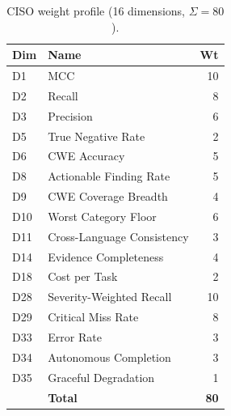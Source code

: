 \documentclass[10pt,twocolumn]{article}
\begin{document}
\begin{table}[t]
\centering
\caption{CISO weight profile (16 dimensions, $\Sigma = 80$).}
\label{tab:ciso_profile}
\small
\begin{tabular}{@{}l l r@{}}
\toprule
\textbf{Dim} & \textbf{Name} & \textbf{Wt} \\
\midrule
D1  & MCC                        & 10 \\
D2  & Recall                     & 8 \\
D3  & Precision                  & 6 \\
D5  & True Negative Rate         & 2 \\
D6  & CWE Accuracy               & 5 \\
D8  & Actionable Finding Rate    & 5 \\
D9  & CWE Coverage Breadth       & 4 \\
D10 & Worst Category Floor       & 6 \\
D11 & Cross-Language Consistency  & 3 \\
D14 & Evidence Completeness      & 4 \\
D18 & Cost per Task              & 2 \\
D28 & Severity-Weighted Recall   & 10 \\
D29 & Critical Miss Rate         & 8 \\
D33 & Error Rate                 & 3 \\
D34 & Autonomous Completion      & 3 \\
D35 & Graceful Degradation       & 1 \\
\midrule
    & \textbf{Total}             & \textbf{80} \\
\bottomrule
\end{tabular}
\end{table}
\end{document}
